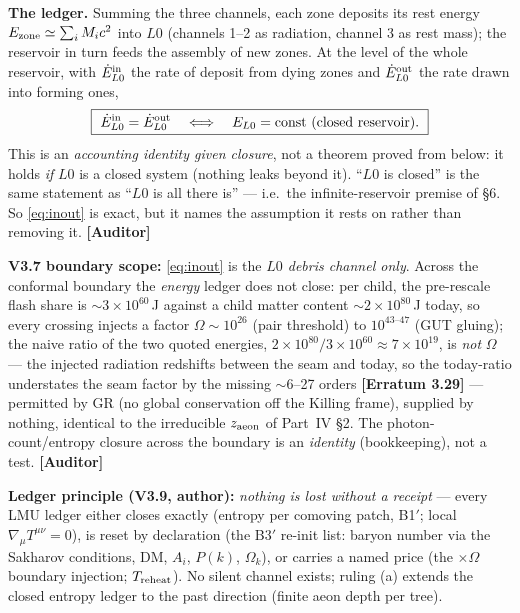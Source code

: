 \documentclass[11pt]{article}
\newcommand{\Auditor}{\textbf{\textcolor{teal!55!black}{[Auditor]}}}
\begin{document}
\textbf{The ledger.} Summing the three channels, each zone deposits its rest energy $E_{\rm zone}\simeq\sum_i M_i c^2$ into $L0$ (channels 1--2 as radiation, channel 3 as rest mass); the reservoir in turn feeds the assembly of new zones. At the level of the whole reservoir, with $\dot E^{\rm in}_{L0}$ the rate of deposit from dying zones and $\dot E^{\rm out}_{L0}$ the rate drawn into forming ones,
\begin{equation}
\boxed{\ \dot E^{\rm in}_{L0}=\dot E^{\rm out}_{L0}\quad\Longleftrightarrow\quad E_{L0}=\text{const (closed reservoir).}\ }
\label{eq:inout}
\end{equation}
This is an \emph{accounting identity given closure}, not a theorem proved from below: it holds \emph{if} $L0$ is a closed system (nothing leaks beyond it). ``$L0$ is closed'' is the same statement as ``$L0$ is all there is'' --- i.e.\ the infinite-reservoir premise of \S6. So \eqref{eq:inout} is exact, but it names the assumption it rests on rather than removing it. \Auditor\par\textbf{V3.7 boundary scope:} \eqref{eq:inout} is the \emph{$L0$ debris channel only}. Across the conformal boundary the \emph{energy} ledger does not close: per child, the pre-rescale flash share is $\sim3\times10^{60}$\,J against a child matter content $\sim2\times10^{80}$\,J today, so every crossing injects a factor $\Omega\sim10^{26}$ (pair threshold) to $10^{43\text{--}47}$ (GUT gluing); the naive ratio of the two quoted energies, $2\times10^{80}/3\times10^{60}\approx7\times10^{19}$, is \emph{not} $\Omega$ --- the injected radiation redshifts between the seam and today, so the today-ratio understates the seam factor by the missing $\sim$6--27 orders \textbf{[Erratum 3.29]} --- permitted by GR (no global conservation off the Killing frame), supplied by nothing, identical to the irreducible $z_{\rm aeon}$ of Part~IV \S2. The photon-count/entropy closure across the boundary is an \emph{identity} (bookkeeping), not a test. \Auditor\par\textbf{Ledger principle (V3.9, author):} \emph{nothing is lost without a receipt} --- every LMU ledger either closes exactly (entropy per comoving patch, B1$'$; local $\nabla_\mu T^{\mu\nu}=0$), is reset by declaration (the B3$'$ re-init list: baryon number via the Sakharov conditions, DM, $A_i$, $P(k)$, $\Omega_k$), or carries a named price (the $\times\Omega$ boundary injection; $T_{\rm reheat}$). No silent channel exists; ruling (a) extends the closed entropy ledger to the past direction (finite aeon depth per tree).
\end{document}
